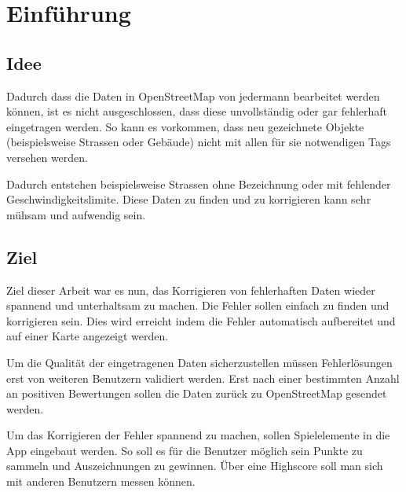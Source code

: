 \section{Einführung}

\subsection{Idee}
Dadurch dass die Daten in OpenStreetMap von jedermann bearbeitet werden können, ist es nicht ausgeschlossen, dass diese unvollständig oder gar fehlerhaft eingetragen werden.
So kann es vorkommen, dass neu gezeichnete Objekte (beispielsweise Strassen oder Gebäude) nicht mit allen für sie notwendigen \glspl{Tag} versehen werden.

Dadurch entstehen beispielsweise Strassen ohne Bezeichnung oder mit fehlender Geschwindigkeitslimite.
Diese Daten zu finden und zu korrigieren kann sehr mühsam und aufwendig sein.

\subsection{Ziel}
Ziel dieser Arbeit war es nun, das Korrigieren von fehlerhaften Daten wieder spannend und unterhaltsam zu machen.
Die Fehler sollen einfach zu finden und korrigieren sein.
Dies wird erreicht indem die Fehler automatisch aufbereitet und auf einer Karte angezeigt werden.

Um die Qualität der eingetragenen Daten sicherzustellen müssen Fehlerlösungen erst von weiteren Benutzern validiert werden.
Erst nach einer bestimmten Anzahl an positiven Bewertungen sollen die Daten zurück zu OpenStreetMap gesendet werden.

Um das Korrigieren der Fehler spannend zu machen, sollen Spielelemente in die App eingebaut werden.
So soll es für die Benutzer möglich sein Punkte zu sammeln und Auszeichnungen zu gewinnen. Über eine Highscore soll man sich mit anderen Benutzern messen können.